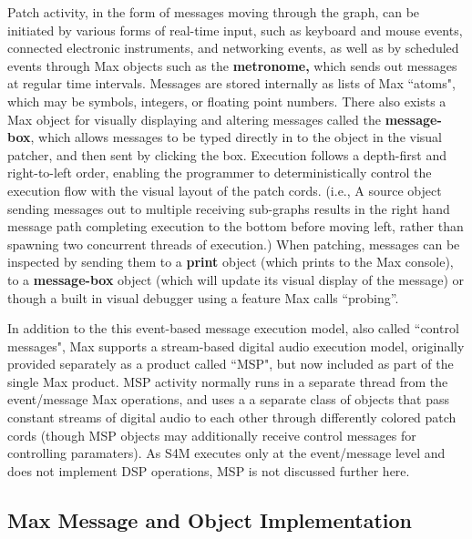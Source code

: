\documentclass[acmsmall]{acmart}
\begin{document}
Patch activity, in the form of messages moving through the graph, can be initiated by 
various forms of real-time input, such as keyboard and mouse events, connected electronic instruments, and networking 
events, as well as by scheduled events through Max objects such as the \textbf{metronome,} which sends
out messages at regular time intervals. Messages are 
stored internally as lists of Max ``atoms", which may be symbols, integers, or floating point numbers. 
\cite{Puckette2002}
There also exists a Max object for visually displaying and altering messages called the \textbf{message-box},
which allows messages to be typed directly in to the object in the visual patcher, and then sent by clicking the box.  
Execution follows a depth-first and right-to-left order, enabling the programmer to deterministically 
control the execution flow with the visual layout of the patch cords. (i.e., A source object sending 
messages out to multiple receiving sub-graphs results in the right hand message path completing 
execution to the bottom before moving left, rather than spawning two concurrent threads of execution.) When 
patching, messages can be inspected by sending them to a \textbf{print} object (which prints to the Max console),
to a \textbf{message-box} object (which will update its visual display of the message) 
or though a built in visual debugger using a feature Max calls ``probing”.

In addition to the this event-based message execution model, also called ``control messages", Max 
supports a stream-based digital 
audio execution model, originally provided separately as a product called ``MSP", but now included 
as part of the single Max product.
MSP activity normally runs in a separate thread from the event/message Max operations, and uses a  
a separate class of objects that pass constant streams of digital audio to each other through differently 
colored patch cords (though MSP objects may additionally receive control messages for controlling paramaters). As  
S4M executes only at the event/message level and does not implement DSP operations, MSP is not 
discussed further here. 


\subsection{Max Message and Object Implementation} 
\end{document}

